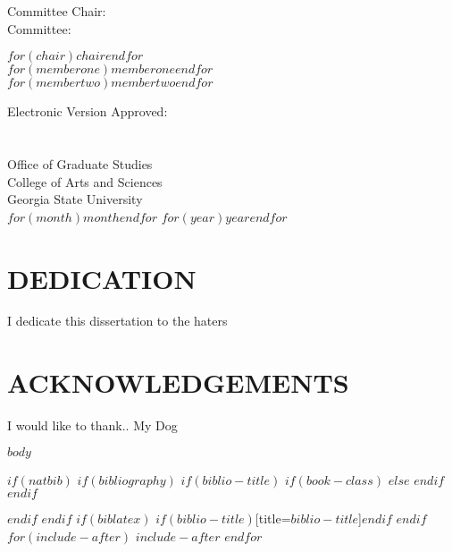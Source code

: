\documentclass[12pt]{report}
\begin{document}
  \hspace{0.33\textwidth}
  \begin{minipage}[t]{0.33\textwidth}
  Committee Chair:\\
  Committee: \\
  \end{minipage}%
  \begin{minipage}[t]{0.33\textwidth}
  \begin{flushright}
  $for(chair)$$chair$$endfor$ \\
  $for(memberone)$$memberone$$endfor$ \\
  $for(membertwo)$$membertwo$$endfor$ \\
  \end{flushright}
  \end{minipage}%
  \vspace{1cm}
  
  \parbox[b]{\textwidth}{
  Electronic Version Approved:\\\\\\
  Office of Graduate Studies\\
  College of Arts and Sciences\\
  Georgia State University\\
  $for(month)$$month$$endfor$ $for(year)$$year$$endfor$
  }


\setcounter{page}{4}
  
\chapter*{DEDICATION}
  I dedicate this dissertation to the haters 

\chapter*{ACKNOWLEDGEMENTS}

  I would like to thank.. My Dog


\tableofcontents
\newpage

{}
\listoftables
\newpage

{}
\listoffigures
\newpage

\cleardoublepage
{}

\newpage

$body$

{} 

\newpage



$if(natbib)$
	$if(bibliography)$
	$if(biblio-title)$
	$if(book-class)$
	\renewcommand\bibname{$biblio-title$}
	$else$
	\renewcommand\refname{$biblio-title$}
	$endif$
	$endif$
	
	$endif$
	$endif$
	$if(biblatex)$
	\printbibliography$if(biblio-title)$[title=$biblio-title$]$endif$
	$endif$
	$for(include-after)$
	$include-after$
	$endfor$
\end{document}
